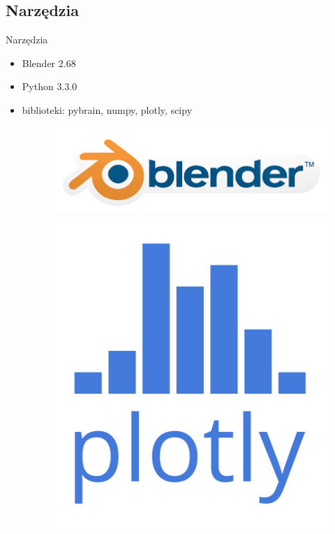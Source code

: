 \documentclass[xcolor=x11names,compress]{beamer}
\renewcommand{\(}{\begin{columns}}
\renewcommand{\)}{\end{columns}}
\newcommand{\<}[1]{\begin{column}{#1}}
\renewcommand{\>}{\end{column}}
\begin{document}
\subsection{Narzędzia}
\begin{frame}{Narzędzia}
	\begin{itemize}
		\item{Blender 2.68} %
		\item{Python 3.3.0} %

		\item{biblioteki: pybrain, numpy, plotly, scipy
                    \begin{figure}[!htb]
                      \includegraphics[width=\linewidth]{blender.png}
                    \endminipage\hfill
                      \includegraphics[width=\linewidth]{plotly.jpg}
                    \endminipage


\end{figure}}
\end{itemize}
\end{frame}
\end{document}

